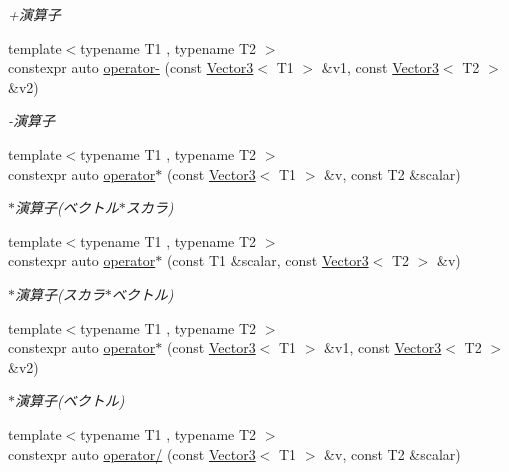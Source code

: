 \begin{DoxyCompactItemize}
\begin{DoxyCompactList}\small\item\em +演算子 \end{DoxyCompactList}\item 
{\footnotesize template$<$typename T1 , typename T2 $>$ }\\constexpr auto \mbox{\hyperlink{namespacesaki_ab4e324d1879fdeb0737196f18a3b42e2}{operator-\/}} (const \mbox{\hyperlink{classsaki_1_1_vector3}{Vector3}}$<$ T1 $>$ \&v1, const \mbox{\hyperlink{classsaki_1_1_vector3}{Vector3}}$<$ T2 $>$ \&v2)
\begin{DoxyCompactList}\small\item\em -\/演算子 \end{DoxyCompactList}\item 
{\footnotesize template$<$typename T1 , typename T2 $>$ }\\constexpr auto \mbox{\hyperlink{namespacesaki_a7e8da947afb09174d52b0e4aaa185d71}{operator$\ast$}} (const \mbox{\hyperlink{classsaki_1_1_vector3}{Vector3}}$<$ T1 $>$ \&v, const T2 \&scalar)
\begin{DoxyCompactList}\small\item\em $\ast$演算子(ベクトル$\ast$スカラ) \end{DoxyCompactList}\item 
{\footnotesize template$<$typename T1 , typename T2 $>$ }\\constexpr auto \mbox{\hyperlink{namespacesaki_a74073980f30054780d16bbda306bb0c4}{operator$\ast$}} (const T1 \&scalar, const \mbox{\hyperlink{classsaki_1_1_vector3}{Vector3}}$<$ T2 $>$ \&v)
\begin{DoxyCompactList}\small\item\em $\ast$演算子(スカラ$\ast$ベクトル) \end{DoxyCompactList}\item 
{\footnotesize template$<$typename T1 , typename T2 $>$ }\\constexpr auto \mbox{\hyperlink{namespacesaki_a44134827291df1234e04cbd1837a05ac}{operator$\ast$}} (const \mbox{\hyperlink{classsaki_1_1_vector3}{Vector3}}$<$ T1 $>$ \&v1, const \mbox{\hyperlink{classsaki_1_1_vector3}{Vector3}}$<$ T2 $>$ \&v2)
\begin{DoxyCompactList}\small\item\em $\ast$演算子(ベクトル) \end{DoxyCompactList}\item 
{\footnotesize template$<$typename T1 , typename T2 $>$ }\\constexpr auto \mbox{\hyperlink{namespacesaki_abbbafb6bb5e04aa715db728862e079a8}{operator/}} (const \mbox{\hyperlink{classsaki_1_1_vector3}{Vector3}}$<$ T1 $>$ \&v, const T2 \&scalar)

\end{DoxyCompactItemize}
